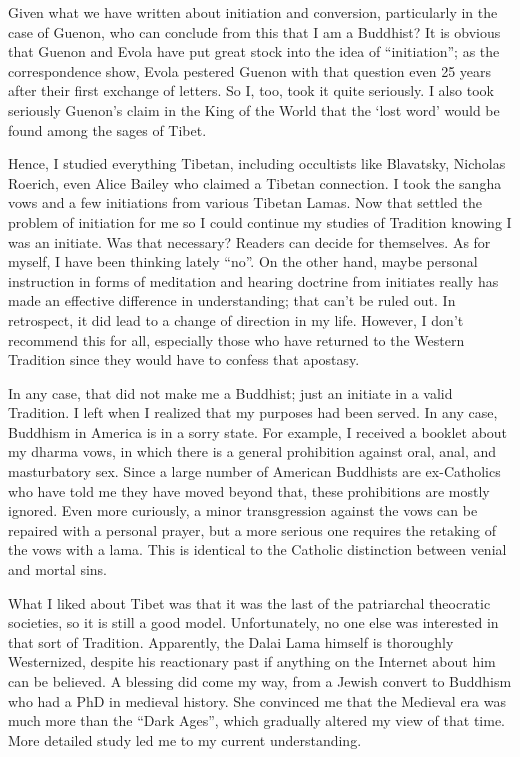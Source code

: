 Given what we have written about initiation and conversion, particularly in the case of Guenon, who can conclude from this that I am a Buddhist? It is obvious that Guenon and Evola have put great stock into the idea of ``initiation''; as the correspondence show, Evola pestered Guenon with that question even 25 years after their first exchange of letters. So I, too, took it quite seriously. I also took seriously Guenon's claim in the King of the World that the `lost word' would be found among the sages of Tibet.

Hence, I studied everything Tibetan, including occultists like Blavatsky, Nicholas Roerich, even Alice Bailey who claimed a Tibetan connection. I took the sangha vows and a few initiations from various Tibetan Lamas. Now that settled the problem of initiation for me so I could continue my studies of Tradition knowing I was an initiate. Was that necessary? Readers can decide for themselves. As for myself, I have been thinking lately ``no''. On the other hand, maybe personal instruction in forms of meditation and hearing doctrine from initiates really has made an effective difference in understanding; that can't be ruled out. In retrospect, it did lead to a change of direction in my life. However, I don't recommend this for all, especially those who have returned to the Western Tradition since they would have to confess that apostasy.

In any case, that did not make me a Buddhist; just an initiate in a valid Tradition. I left when I realized that my purposes had been served. In any case, Buddhism in America is in a sorry state. For example, I received a booklet about my dharma vows, in which there is a general prohibition against oral, anal, and masturbatory sex. Since a large number of American Buddhists are ex-Catholics who have told me they have moved beyond that, these prohibitions are mostly ignored. Even more curiously, a minor transgression against the vows can be repaired with a personal prayer, but a more serious one requires the retaking of the vows with a lama. This is identical to the Catholic distinction between venial and mortal sins.

What I liked about Tibet was that it was the last of the patriarchal theocratic societies, so it is still a good model. Unfortunately, no one else was interested in that sort of Tradition. Apparently, the Dalai Lama himself is thoroughly Westernized, despite his reactionary past if anything on the Internet about him can be believed. A blessing did come my way, from a Jewish convert to Buddhism who had a PhD in medieval history. She convinced me that the Medieval era was much more than the ``Dark Ages'', which gradually altered my view of that time. More detailed study led me to my current understanding.

